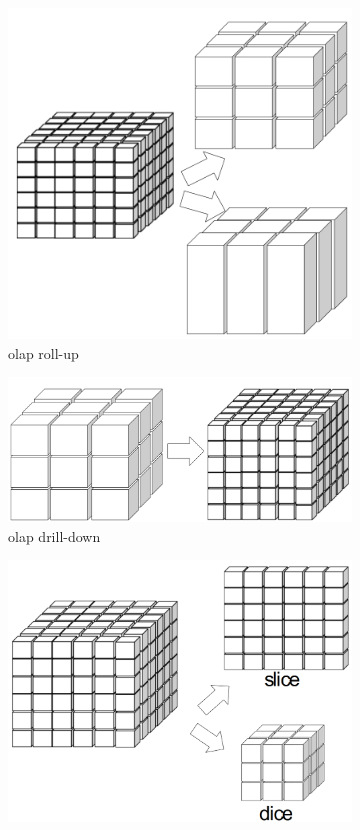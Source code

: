 \begin{figure}[ht]
    \begin{subfigure}{.33\textwidth}
        \centering
        \includegraphics[width=.60\linewidth]{img/olap_rollup.png}
        \caption{\ac{olap} roll-up}
    \end{subfigure}%
    \begin{subfigure}{.33\textwidth}
        \centering
        \includegraphics[width=.60\linewidth]{img/olap_drilldown.png}
        \caption{\ac{olap} drill-down}
    \end{subfigure}
    \begin{subfigure}{.33\textwidth}
        \centering
        \includegraphics[width=.80\linewidth]{img/olap_slicedice.png}

\end{subfigure}
\end{figure}
